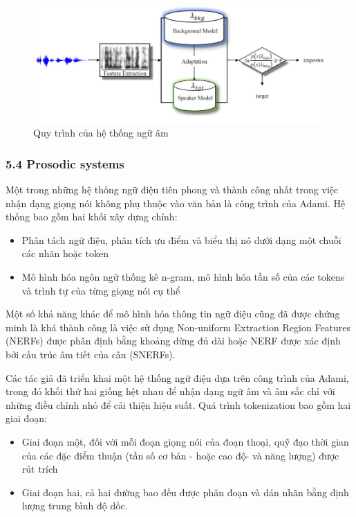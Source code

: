 \documentclass{article}
\begin{document}
	\begin{figure}[H]
		\centering
		\includegraphics[width=1\linewidth]{images/diagram.png}
		\caption{Quy trình của hệ thống ngữ âm}
		\label{fig:writing-thesis}
	\end{figure}
	
	\subsubsection{5.4 Prosodic systems}
	\qquad Một trong những hệ thống ngữ điệu tiên phong và thành công nhất trong việc nhận dạng giọng nói không phụ thuộc vào văn bản là công trình của Adami. Hệ thống bao gồm hai khối xây dựng chính: 
	\begin{itemize}
		\item Phân tách ngữ điệu, phân tích ưu điểm và biểu thị nó dưới dạng một chuỗi các nhãn hoặc token
		\item Mô hình hóa ngôn ngữ thống kê n-gram, mô hình hóa tần số của các tokens và trình tự của từng giọng nói cụ thể
	\end{itemize}
	 
	 Một số khả năng khác để mô hình hóa thông tin ngữ điệu cũng đã được chứng minh là khá thành công là việc sử dụng Non-uniform Extraction Region Features (NERFs) được phân định bằng khoảng dừng đủ dài hoặc NERF được xác định bởi cấu trúc âm tiết của câu (SNERFs).
	
	Các tác giả đã triển khai một hệ thống ngữ điệu dựa trên công trình của Adami, trong đó khối thứ hai giống hệt nhau để nhận dạng ngữ âm và âm sắc chỉ với những điều chỉnh nhỏ để cải thiện hiệu suất. Quá trình tokenization bao gồm hai giai đoạn:
	\begin{itemize}
		\item Giai đoạn một, đối với mỗi đoạn giọng nói của đoạn thoại, quỹ đạo thời gian của các đặc điểm thuận (tần số cơ bản - hoặc cao độ- và năng lượng) được rút trích
		\item Giai đoạn hai, cả hai đường bao đều được phân đoạn và dán nhãn bằng định lượng trung bình độ dốc.
	\end{itemize}
\end{document}
